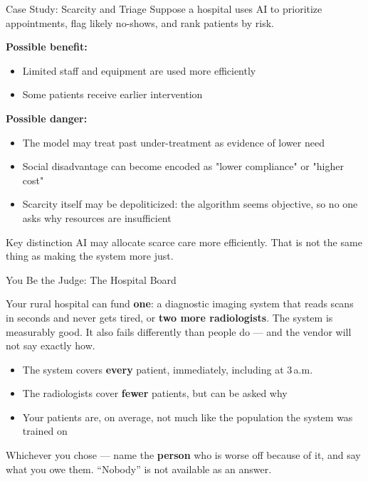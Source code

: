 \documentclass[aspectratio=169,11pt]{beamer}
\begin{document}
\begin{frame}{Case Study: Scarcity and Triage}
Suppose a hospital uses AI to prioritize appointments, flag likely no-shows, and rank patients by risk.

\vspace{0.2cm}
\textbf{Possible benefit:}
\begin{itemize}
    \item Limited staff and equipment are used more efficiently
    \item Some patients receive earlier intervention
\end{itemize}

\vspace{0.2cm}
\textbf{Possible danger:}
\begin{itemize}
    \item The model may treat past under-treatment as evidence of lower need
    \item Social disadvantage can become encoded as "lower compliance" or "higher cost"
    \item Scarcity itself may be depoliticized: the algorithm seems objective, so no one asks why resources are insufficient
\end{itemize}

\begin{alertblock}{Key distinction}
AI may allocate scarce care more efficiently. That is not the same thing as making the system more just.
\end{alertblock}
\end{frame}
\begin{frame}[shrink=8]{You Be the Judge: The Hospital Board}
\begin{casestudybox}
\small
Your rural hospital can fund \textbf{one}: a diagnostic imaging system that reads scans in seconds and never gets tired, or \textbf{two more radiologists}. The system is measurably good. It also fails differently than people do --- and the vendor will not say exactly how.
\end{casestudybox}

\begin{itemize}
    \item The system covers \textbf{every} patient, immediately, including at 3\,a.m.
    \item The radiologists cover \textbf{fewer} patients, but can be asked why
    \item Your patients are, on average, not much like the population the system was trained on
\end{itemize}

\begin{discussionbox}
Whichever you chose --- name the \textbf{person} who is worse off because of it, and say what you owe them. ``Nobody'' is not available as an answer.
\end{discussionbox}
\end{frame}
\end{document}
